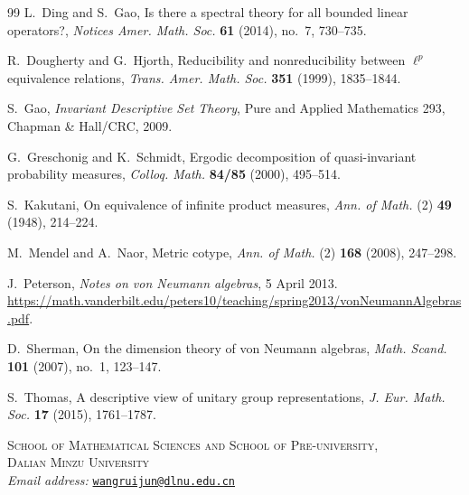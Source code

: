 \documentclass[11pt]{article}
\theoremstyle{definition}
\begin{document}

\begin{thebibliography}{99}
L.~Ding and S.~Gao,
Is there a spectral theory for all bounded linear operators?,
\emph{Notices Amer. Math. Soc.} \textbf{61} (2014), no.~7, 730--735.

R.~Dougherty and G.~Hjorth,
Reducibility and nonreducibility between $\ell^p$ equivalence relations,
\emph{Trans. Amer. Math. Soc.} \textbf{351} (1999), 1835--1844.


S.~Gao, \emph{Invariant Descriptive Set Theory},
Pure and Applied Mathematics 293, Chapman \& Hall/CRC, 2009.

G.~Greschonig and K.~Schmidt,
Ergodic decomposition of quasi-invariant probability measures,
\emph{Colloq. Math.} \textbf{84/85} (2000), 495--514.

S.~Kakutani, On equivalence of infinite product measures,
\emph{Ann. of Math.} (2) \textbf{49} (1948), 214--224.

M.~Mendel and A.~Naor, Metric cotype,
\emph{Ann. of Math.} (2) \textbf{168} (2008), 247--298.

J.~Peterson, \emph{Notes on von Neumann algebras}, 5 April 2013.
\url{https://math.vanderbilt.edu/peters10/teaching/spring2013/vonNeumannAlgebras.pdf}.

D.~Sherman, On the dimension theory of von Neumann algebras,
\emph{Math. Scand.} \textbf{101} (2007), no.~1, 123--147.

S.~Thomas, A descriptive view of unitary group representations,
\emph{J. Eur. Math. Soc.} \textbf{17} (2015), 1761--1787.

\end{thebibliography}
\noindent\begin{minipage}{\textwidth}
\small
\textsc{School of Mathematical Sciences and School of Pre-university,}\\
\textsc{Dalian Minzu University}\\[0.4em]
\textit{Email address:}\enspace
\href{mailto:wangruijun@dlnu.edu.cn}{\texttt{wangruijun@dlnu.edu.cn}}
\end{minipage}
\end{document}
